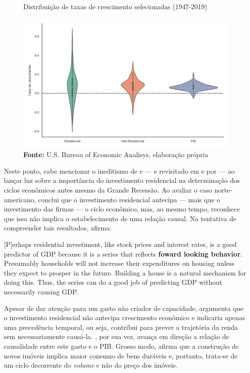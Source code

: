 \begin{figure}[H]
	\centering
	\caption{Distribuição de taxas de crescimento selecionadas (1947-2019)}
	\label{FigVolatilidade}
	\includegraphics[width=\textwidth]{../../Dados/Fatos_Estilizados/figs/Volatilidade.png}
	\caption*{\textbf{Fonte:} U.S. Bureau of Economic Analisys, elaboração própria}
\end{figure}

Neste ponto, cabe mencionar o ineditismo de \textcite{green_follow_1997} e \textcite{leamer_housing_2007} --- e revisitado em \textcite{leamer_housing_2015} e por \textcite{fiebiger_trend_2017} --- ao lançar luz sobre a importância do investimento residencial na determinação dos ciclos econômicos antes mesmo da Grande Recessão. 
Ao avaliar o caso norte-americano, \textcite{green_follow_1997} conclui que o
investimento residencial antecipa --- mais que o investimento das firmas --- o ciclo econômico, mas, ao mesmo tempo, reconhece que isso não implica o estabelecimento de uma relação causal. Na tentativa de compreender tais resultados, afirma:

\begin{citacao}
	
	[P]erhaps residential investiment, like stock prices and interest rates, is a good predictor of GDP because it is a series that reflects \textbf{foward looking behavior}. Presumably households will not increase their expenditures on housing unless they expect to prosper in the future. Building a house is a natural mechanism for doing this. Thus, the series can do a good job of predicting GDP without necessarily causing GDP.
	\cite[p.~267, grifos adicionados]{green_follow_1997}
\end{citacao}
Apesar de dar atenção para um gasto não criador de capacidade, \textcite{green_follow_1997} argumenta que o investimento residencial não antecipa crescimento econômico e indicaria apenas uma precedência temporal, ou seja, contribui para prever a trajetória da renda sem necessariamente causá-la.
\textcite{leamer_housing_2007}, por sua vez, avança em direção a relação de causalidade entre este gasto e o PIB. Grosso modo, afirma que a construção de novos imóveis implica maior consumo de bens duráveis e, portanto, trata-se de um ciclo decorrente do \textit{volume} e não do preço dos imóveis. 

